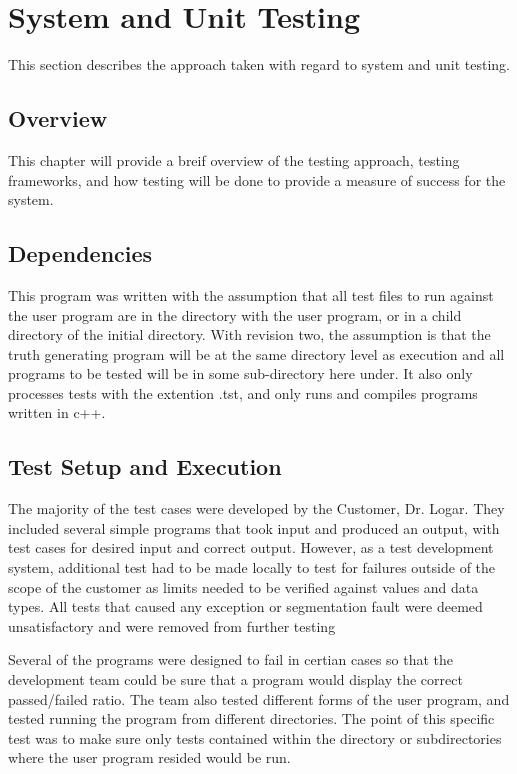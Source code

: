 
\chapter{System  and Unit Testing}

This section describes the approach taken with regard to system and unit testing. 

\section{Overview}
This chapter will provide a breif overview of the testing approach, testing frameworks, 
and how testing will be done to provide a measure of success for the system.

\section{Dependencies}
This program was written with the assumption that all test files to run against the user program are in the directory with the user program, or in a child directory of the initial directory.  With revision two, the assumption is that the truth generating program will be at the same directory level as execution and all programs to be tested will be in some sub-directory here under.  It also only processes tests with the extention .tst, and only runs and compiles programs written in c++.


\section{Test Setup and Execution}
The majority of the test cases were developed by the Customer, Dr. Logar. They included several simple programs that took input and produced an output, with test cases for desired input and correct output.   However, as a test development system, additional test had to be made locally to test for failures outside of the scope of the customer as limits needed to be verified against values and data types.  All tests that caused any exception or segmentation fault were deemed unsatisfactory and were removed from further testing

Several of the programs were designed to fail in certian cases so that the development team could be sure that a program would display the correct passed/failed ratio. The team also tested different forms of the user program, and tested running the program from different directories. The point of this specific test was to make sure only tests contained within the directory or subdirectories where the user program resided would be run. 


